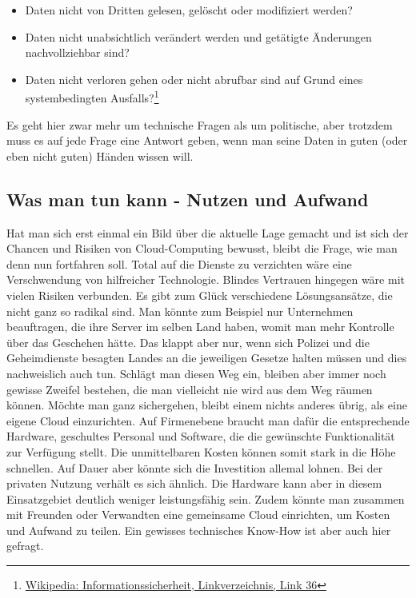 \begin{itemize}
\item Daten nicht von Dritten gelesen, gelöscht oder modifiziert werden?
\item Daten nicht unabsichtlich verändert werden und getätigte Änderungen nachvollziehbar sind?
\item Daten nicht verloren gehen oder nicht abrufbar sind auf Grund eines systembedingten Ausfalls?\footnote{\hyperlink{link36}{Wikipedia: Informationssicherheit, Linkverzeichnis, Link 36}}
\end{itemize}

Es geht hier zwar mehr um technische Fragen als um politische, aber trotzdem muss es auf jede Frage eine Antwort geben, wenn man seine Daten in guten (oder eben nicht guten) Händen wissen will.

\subsection{Was man tun kann - Nutzen und Aufwand}
Hat man sich erst einmal ein Bild über die aktuelle Lage gemacht und ist sich der Chancen und Risiken von Cloud-Computing bewusst, bleibt die Frage, wie man denn nun fortfahren soll. Total auf die Dienste zu verzichten wäre eine Verschwendung von hilfreicher Technologie. Blindes Vertrauen hingegen wäre mit vielen Risiken verbunden. Es gibt zum Glück verschiedene Lösungsansätze, die nicht ganz so radikal sind. Man könnte zum Beispiel nur Unternehmen beauftragen, die ihre Server im selben Land haben, womit man mehr Kontrolle über das Geschehen hätte. Das klappt aber nur, wenn sich Polizei und die Geheimdienste besagten Landes an die jeweiligen Gesetze halten müssen und dies nachweislich auch tun. Schlägt man diesen Weg ein, bleiben aber immer noch gewisse Zweifel bestehen, die man vielleicht nie wird aus dem Weg räumen können. Möchte man ganz sichergehen, bleibt einem nichts anderes übrig, als eine eigene Cloud einzurichten. Auf Firmenebene braucht man dafür die entsprechende Hardware, geschultes Personal und  Software, die die gewünschte Funktionalität zur Verfügung stellt. Die unmittelbaren Kosten können somit stark in die Höhe schnellen. Auf Dauer aber könnte sich die Investition allemal lohnen. Bei der privaten Nutzung verhält es sich ähnlich. Die Hardware kann aber in diesem Einsatzgebiet deutlich weniger leistungsfähig sein. Zudem könnte man zusammen mit Freunden oder Verwandten eine gemeinsame Cloud einrichten, um Kosten und Aufwand zu teilen. Ein gewisses technisches Know-How ist aber auch hier gefragt.

